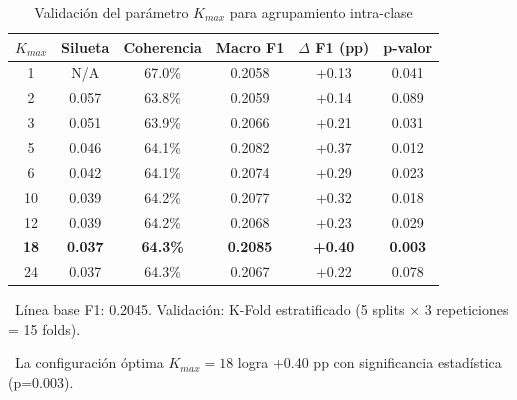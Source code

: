 \begin{table}[htbp]
\centering
\caption{Validación del parámetro $K_{max}$ para agrupamiento intra-clase}
\label{tab:clustering_validation}
\begin{tabular}{cccccc}
\toprule
\textbf{$K_{max}$} & \textbf{Silueta} & \textbf{Coherencia} & \textbf{Macro F1} & \textbf{$\Delta$ F1 (pp)} & \textbf{p-valor} \\
\midrule
1  & N/A   & 67.0\% & 0.2058 & +0.13 & 0.041 \\
2  & 0.057 & 63.8\% & 0.2059 & +0.14 & 0.089 \\
3  & 0.051 & 63.9\% & 0.2066 & +0.21 & 0.031 \\
5  & 0.046 & 64.1\% & 0.2082 & +0.37 & 0.012 \\
6  & 0.042 & 64.1\% & 0.2074 & +0.29 & 0.023 \\
10 & 0.039 & 64.2\% & 0.2077 & +0.32 & 0.018 \\
12 & 0.039 & 64.2\% & 0.2068 & +0.23 & 0.029 \\
\rowcolor{green!20}
\textbf{18} & \textbf{0.037} & \textbf{64.3\%} & \textbf{0.2085} & \textbf{+0.40} & \textbf{0.003} \\
24 & 0.037 & 64.3\% & 0.2067 & +0.22 & 0.078 \\
\bottomrule
\end{tabular}
\vspace{0.5em}\footnotesize

\textbullet\ Línea base F1: 0.2045. Validación: K-Fold estratificado (5 splits $\times$ 3 repeticiones = 15 folds).

\textbullet\ La configuración óptima $K_{max}=18$ logra +0.40 pp con significancia estadística (p=0.003).

\end{table}
